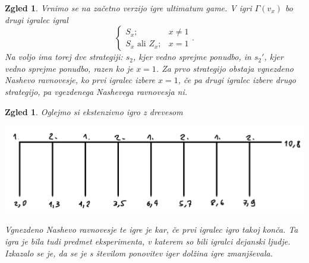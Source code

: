 \documentclass[10pt, a4paper]{article}
\newtheorem{zgled}[izr]{Zgled}
\begin{document}
\begin{zgled}
  Vrnimo se na začetno verzijo igre ultimatum game.
  V igri $\Gamma(v_x)$ bo drugi igralec igral
  $$\begin{cases}
    S_x;& x \neq 1\\
    \text{$S_x$ ali $Z_x$};& x = 1
  \end{cases}.$$
  Na voljo ima torej dve strategiji: $s_2$, kjer vedno sprejme ponudbo, in $s_2'$, kjer vedno sprejme ponudbo, razen ko je $x = 1$.
  Za prvo strategijo obstaja vgnezdeno Nashevo ravnovesje, ko prvi igralec izbere $x = 1$, če pa drugi igralec izbere drugo strategijo, pa vgezdenega Nashevega ravnovesja ni.
\end{zgled}

\begin{zgled}
  Oglejmo si ekstenzivno igro z drevesom 
  \begin{center}
    \includegraphics[scale=0.6]{drevo_6.png}
  \end{center}
  Vgnezdeno Nashevo ravnovesje te igre je kar, če prvi igralec igro takoj konča.
  Ta igra je bila tudi predmet eksperimenta, v katerem so bili igralci dejanski ljudje.
  Izkazalo se je, da se je s številom ponovitev iger dolžina igre zmanjševala.
\end{zgled}
\end{document}
